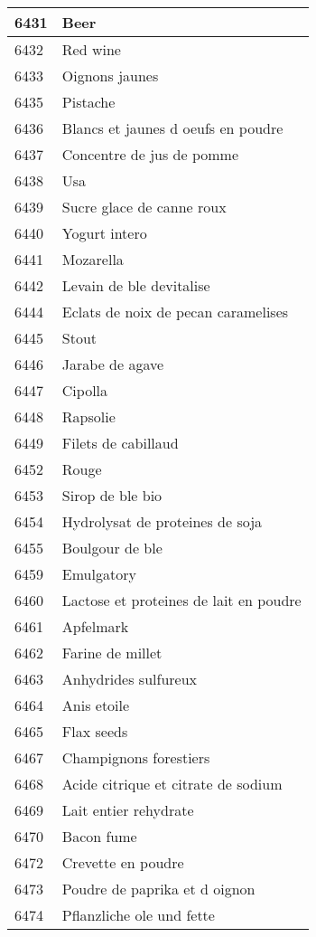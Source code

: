 \begin{longtable}{|l|l|}
6431 & Beer \\ \hline 
6432 & Red wine \\ \hline 
6433 & Oignons jaunes \\ \hline 
6435 & Pistache \\ \hline 
6436 & Blancs et jaunes d oeufs en poudre \\ \hline 
6437 & Concentre de jus de pomme \\ \hline 
6438 & Usa \\ \hline 
6439 & Sucre glace de canne roux \\ \hline 
6440 & Yogurt intero \\ \hline 
6441 & Mozarella \\ \hline 
6442 & Levain de ble devitalise \\ \hline 
6444 & Eclats de noix de pecan caramelises \\ \hline 
6445 & Stout \\ \hline 
6446 & Jarabe de agave \\ \hline 
6447 & Cipolla \\ \hline 
6448 & Rapsolie \\ \hline 
6449 & Filets de cabillaud \\ \hline 
6452 & Rouge \\ \hline 
6453 & Sirop de ble bio \\ \hline 
6454 & Hydrolysat de proteines de soja \\ \hline 
6455 & Boulgour de ble \\ \hline 
6459 & Emulgatory \\ \hline 
6460 & Lactose et proteines de lait en poudre \\ \hline 
6461 & Apfelmark \\ \hline 
6462 & Farine de millet \\ \hline 
6463 & Anhydrides sulfureux \\ \hline 
6464 & Anis etoile \\ \hline 
6465 & Flax seeds \\ \hline 
6467 & Champignons forestiers \\ \hline 
6468 & Acide citrique et citrate de sodium \\ \hline 
6469 & Lait entier rehydrate \\ \hline 
6470 & Bacon fume \\ \hline 
6472 & Crevette en poudre \\ \hline 
6473 & Poudre de paprika et d oignon \\ \hline 
6474 & Pflanzliche ole und fette \\ \hline 

\end{longtable}
